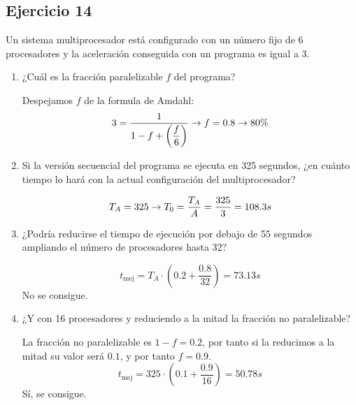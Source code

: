 \subsection{Ejercicio 14}
\noindent
Un sistema multiprocesador está configurado con un número fijo de 6 procesadores y la aceleración conseguida con un programa es igual a 3.
\begin{enumerate}
    \item ¿Cuál es la fracción paralelizable $f$ del programa?
\begin{tcolorbox}[colback=white,colframe=cyan!50!black,fonttitle=\bfseries]
Despejamos $f$ de la formula de Amdahl:
\[
3=\dfrac{1}{1-f+\left(\dfrac{f}{6}\right)}\rightarrow f=0.8\rightarrow 80\%
\]
\end{tcolorbox}    
    \item Si la versión secuencial del programa se ejecuta en 325 segundos, ¿en cuánto tiempo lo hará con la actual configuración del multiprocesador?
\begin{tcolorbox}[colback=white,colframe=cyan!50!black,fonttitle=\bfseries]
\[
T_A=325\rightarrow T_0=\dfrac{T_A}{A}=\dfrac{325}{3}=108.3s
\]
\end{tcolorbox}    
    \item ¿Podría reducirse el tiempo de ejecución por debajo de 55 segundos ampliando el número de procesadores hasta 32?
\begin{tcolorbox}[colback=white,colframe=cyan!50!black,fonttitle=\bfseries]
\[
t_{\text{mej}}=T_A\cdot\left(0.2+\dfrac{0.8}{32}\right)=73.13s
\]
No se consigue.
\end{tcolorbox}    
    \item ¿Y con 16 procesadores y reduciendo a la mitad la fracción no paralelizable?
\begin{tcolorbox}[colback=white,colframe=cyan!50!black,fonttitle=\bfseries]
La fracción no paralelizable es $1-f = 0.2$, por tanto si la reducimos a la mitad su valor será $0.1$, y por tanto $f=0.9$.
\[
t_{\text{mej}}=325\cdot\left(0.1+\dfrac{0.9}{16}\right)=50.78s
\]
Sí, se consigue.
\end{tcolorbox}    
\end{enumerate}